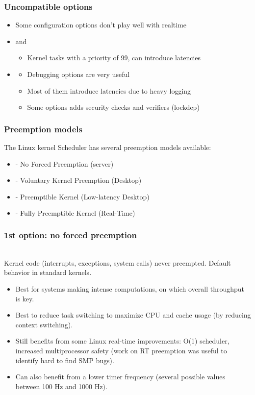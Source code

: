\begin{frame}
  \frametitle{Uncompatible options}
	\begin{itemize}
		\item Some configuration options don't play well with realtime
		\item {} and 
			\begin{itemize}
				\item Kernel tasks with a priority of 99, can introduce latencies
			\end{itemize}
		\item {}
			\begin{itemize}
				\item Debugging options are very useful
				\item Most of them introduce latencies due to heavy logging
				\item Some options adds security checks and verifiers (lockdep)
			\end{itemize}
	\end{itemize}
\end{frame}

\begin{frame}
  \frametitle{Preemption models}
  The Linux kernel Scheduler has several preemption models available:
	\begin{itemize}
		\item {} - No Forced Preemption (server)
		\item {} - Voluntary Kernel Preemption (Desktop)
		\item {} - Preemptible Kernel (Low-latency Desktop)
		\item {} - Fully Preemptible Kernel (Real-Time)
	\end{itemize}
\end{frame}

\begin{frame}
  \frametitle{1st option: no forced preemption}
  \\
  Kernel code (interrupts, exceptions, system calls) never preempted.
  Default behavior in standard kernels.
  \begin{itemize}
  \item Best for systems making intense computations, on which overall
    throughput is key.
  \item Best to reduce task switching to maximize CPU and cache usage
    (by reducing context switching).
  \item Still benefits from some Linux real-time improvements: O(1)
    scheduler, increased multiprocessor safety (work on RT preemption
    was useful to identify hard to find SMP bugs).
  \item Can also benefit from a lower timer frequency (several possible
        values between 100 Hz and 1000 Hz).
  \end{itemize}
\end{frame}

